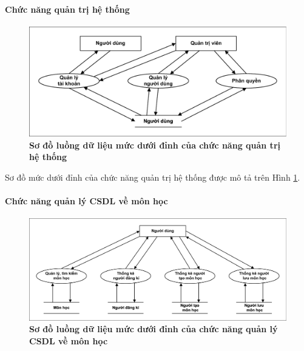 \documentclass{article}
\begin{document}
	\paragraph{Chức năng quản trị hệ thống} \mbox{}
	
	\begin{figure}[!ht]
		\centering
		\includegraphics[trim= 10pt 10pt 10pt 10pt, clip, width=15cm]{mucduoidinh_fig34.pdf}
		\caption [Sơ đồ luồng dữ liệu mức dưới đỉnh của chức năng quản trị hệ thống]{\bfseries \fontsize{12pt}{0pt}\selectfont Sơ đồ luồng dữ liệu mức dưới đỉnh của chức năng quản trị hệ thống}
		\label{fig34}
	\end{figure}
	
	Sơ đồ mức dưới đỉnh của chức năng quản trị hệ thống được mô tả trên Hình \ref{fig34}.
	
	\paragraph{Chức năng quản lý CSDL về môn học} \mbox{}
	
	\begin{figure}[!ht]
		\centering
		\includegraphics[trim= 10pt 10pt 10pt 10pt, clip, width=16.25cm]{mucduoidinh_fig35.pdf}
		\caption [Sơ đồ luồng dữ liệu mức dưới đỉnh của chức năng quản lý CSDL về môn học]{\bfseries \fontsize{12pt}{0pt}\selectfont Sơ đồ luồng dữ liệu mức dưới đỉnh của chức năng quản lý CSDL về môn học}
		\label{fig35}
	\end{figure}
	
\end{document}
